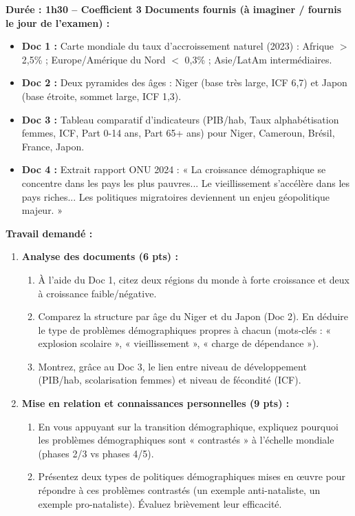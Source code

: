 \documentclass[11pt]{article}
\begin{document}
\begin{exercice}
\textbf{Durée : 1h30 -- Coefficient 3}
\textbf{Documents fournis (à imaginer / fournis le jour de l'examen) :}
\begin{itemize}
    \item \textbf{Doc 1 :} Carte mondiale du taux d'accroissement naturel (2023) : Afrique $>$ 2,5\% ; Europe/Amérique du Nord $<$ 0,3\% ; Asie/LatAm intermédiaires.
    \item \textbf{Doc 2 :} Deux pyramides des âges : Niger (base très large, ICF 6,7) et Japon (base étroite, sommet large, ICF 1,3).
    \item \textbf{Doc 3 :} Tableau comparatif d'indicateurs (PIB/hab, Taux alphabétisation femmes, ICF, Part 0-14 ans, Part 65+ ans) pour Niger, Cameroun, Brésil, France, Japon.
    \item \textbf{Doc 4 :} Extrait rapport ONU 2024 : « La croissance démographique se concentre dans les pays les plus pauvres... Le vieillissement s'accélère dans les pays riches... Les politiques migratoires deviennent un enjeu géopolitique majeur. »
\end{itemize}
\textbf{Travail demandé :}
\begin{enumerate}
    \item \textbf{Analyse des documents (6 pts) :}
    \begin{enumerate}
        \item À l'aide du Doc 1, citez deux régions du monde à forte croissance et deux à croissance faible/négative.
        \item Comparez la structure par âge du Niger et du Japon (Doc 2). En déduire le type de problèmes démographiques propres à chacun (mots-clés : « explosion scolaire », « vieillissement », « charge de dépendance »).
        \item Montrez, grâce au Doc 3, le lien entre niveau de développement (PIB/hab, scolarisation femmes) et niveau de fécondité (ICF).
    \end{enumerate}
    \item \textbf{Mise en relation et connaissances personnelles (9 pts) :}
    \begin{enumerate}
        \item En vous appuyant sur la transition démographique, expliquez pourquoi les problèmes démographiques sont « contrastés » à l'échelle mondiale (phases 2/3 vs phases 4/5).
        \item Présentez deux types de politiques démographiques mises en œuvre pour répondre à ces problèmes contrastés (un exemple anti-nataliste, un exemple pro-nataliste). Évaluez brièvement leur efficacité.

\end{enumerate}
\end{enumerate}
\end{exercice}
\end{document}
